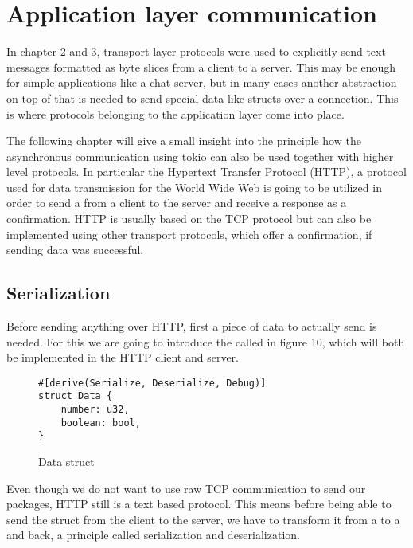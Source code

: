 
\section{Application layer communication}
In chapter 2 and 3, transport layer protocols were used to explicitly send text messages formatted as byte slices from
a client to a server. This may be enough for simple applications like a chat server, but in many cases another
abstraction on top of that is needed to send special data like structs over a connection. This is where protocols
belonging to the application layer come into place.

The following chapter will give a small insight into the principle how the asynchronous communication using tokio can
also be used together with higher level protocols. In particular the Hypertext Transfer Protocol (HTTP), a protocol
used for data transmission for the World Wide Web is going to be utilized in order to send a  from a
client to the server and receive a response as a confirmation. HTTP is usually based on the TCP protocol but can also
be implemented using other transport protocols, which offer a confirmation, if sending data was successful.

\subsection{Serialization}
Before sending anything over HTTP, first a piece of data to actually send is needed. For this we are going to introduce
the  called  in figure 10, which will both be implemented in the HTTP client and server.

\begin{figure}[ht]
    \begin{verbatim}
#[derive(Serialize, Deserialize, Debug)]
struct Data {
    number: u32,
    boolean: bool,
}
    \end{verbatim}
    \caption{Data struct}
\end{figure}

Even though we do not want to use raw TCP communication to send our packages, HTTP still is a text based protocol. This
means before being able to send the struct from the client to the server, we have to transform it from a 
to a  and back, a principle called serialization and deserialization.

